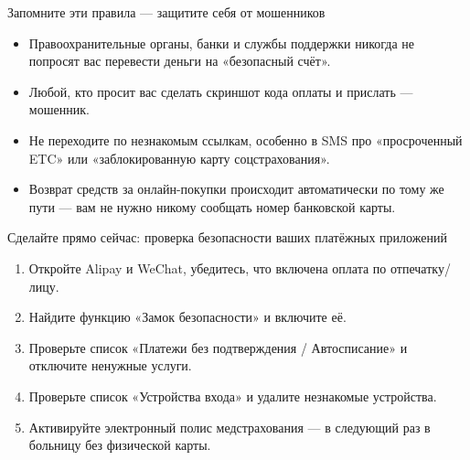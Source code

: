 \begin{tcbwarn}{Запомните эти правила — защитите себя от мошенников}
\begin{itemize}
  \item Правоохранительные органы, банки и службы поддержки никогда не попросят вас перевести деньги на «безопасный счёт».
  \item Любой, кто просит вас сделать скриншот кода оплаты и прислать — мошенник.
  \item Не переходите по незнакомым ссылкам, особенно в SMS про «просроченный ETC» или «заблокированную карту соцстрахования».
  \item Возврат средств за онлайн-покупки происходит автоматически по тому же пути — вам не нужно никому сообщать номер банковской карты.
\end{itemize}

\end{tcbwarn}

\begin{tcbpractice}{Сделайте прямо сейчас: проверка безопасности ваших платёжных приложений}
\begin{enumerate}
  \item Откройте Alipay и WeChat, убедитесь, что включена оплата по отпечатку/лицу.
  \item Найдите функцию «Замок безопасности» и включите её.
  \item Проверьте список «Платежи без подтверждения / Автосписание» и отключите ненужные услуги.
  \item Проверьте список «Устройства входа» и удалите незнакомые устройства.
  \item Активируйте электронный полис медстрахования — в следующий раз в больницу без физической карты.
\end{enumerate}

\end{tcbpractice}
